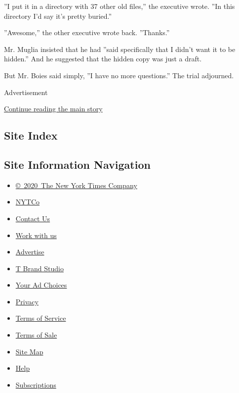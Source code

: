''I put it in a directory with 37 other old files,'' the executive
wrote. ''In this directory I'd say it's pretty buried.''

''Awesome,'' the other executive wrote back. ''Thanks.''

Mr. Muglia insisted that he had ''said specifically that I didn't want
it to be hidden.'' And he suggested that the hidden copy was just a
draft.

But Mr. Boies said simply, ''I have no more questions.'' The trial
adjourned.

Advertisement

\protect\hyperlink{after-bottom}{Continue reading the main story}

\hypertarget{site-index}{%
\subsection{Site Index}\label{site-index}}

\hypertarget{site-information-navigation}{%
\subsection{Site Information
Navigation}\label{site-information-navigation}}

\begin{itemize}
\tightlist
\item
  \href{https://help.nytimes3xbfgragh.onion/hc/en-us/articles/115014792127-Copyright-notice}{©~2020~The
  New York Times Company}
\end{itemize}

\begin{itemize}
\tightlist
\item
  \href{https://www.nytco.com/}{NYTCo}
\item
  \href{https://help.nytimes3xbfgragh.onion/hc/en-us/articles/115015385887-Contact-Us}{Contact
  Us}
\item
  \href{https://www.nytco.com/careers/}{Work with us}
\item
  \href{https://nytmediakit.com/}{Advertise}
\item
  \href{http://www.tbrandstudio.com/}{T Brand Studio}
\item
  \href{https://www.nytimes3xbfgragh.onion/privacy/cookie-policy\#how-do-i-manage-trackers}{Your
  Ad Choices}
\item
  \href{https://www.nytimes3xbfgragh.onion/privacy}{Privacy}
\item
  \href{https://help.nytimes3xbfgragh.onion/hc/en-us/articles/115014893428-Terms-of-service}{Terms
  of Service}
\item
  \href{https://help.nytimes3xbfgragh.onion/hc/en-us/articles/115014893968-Terms-of-sale}{Terms
  of Sale}
\item
  \href{https://spiderbites.nytimes3xbfgragh.onion}{Site Map}
\item
  \href{https://help.nytimes3xbfgragh.onion/hc/en-us}{Help}
\item
  \href{https://www.nytimes3xbfgragh.onion/subscription?campaignId=37WXW}{Subscriptions}
\end{itemize}
